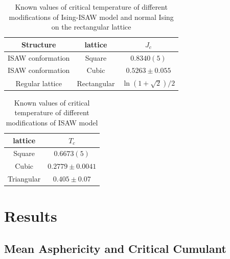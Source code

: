\documentclass[a4paper]{jpconf}
\begin{document}
\begin{table}[h]
    \centering
    \begin{tabular}{|c|c|c|}
        \hline
        Structure & lattice & $J_{c}$ \\ \hline
        ISAW conformation & Square & $0.8340(5)$\cite{faizullina2021critical} \\ \hline
        ISAW conformation & Cubic & $0.5263 \pm 0.055$\cite{Foster2021}\\ \hline
        Regular lattice & Rectangular & $\ln{(1 + \sqrt{2}) / 2}$\cite{Onsager}\\ \hline
    \end{tabular}
    \caption{Known values of critical temperature of different modifications of Ising-ISAW model and normal Ising on the rectangular lattice}
    \label{tab:Ising_T_c}
\end{table}

\begin{table}[h]
    \centering
    \begin{tabular}{|c|c|}
        \hline
        lattice & $T_{c}$ \\ \hline
        Square & $0.6673(5)$ \cite{Caracciolo2011} \\ \hline
        Cubic & $0.2779 \pm 0.0041$\cite{Tesi1996} \\ \hline
        Triangular & $ 0.405 \pm 0.07$\cite{Privman1986} \\ \hline
    \end{tabular}
    \caption{Known values of critical temperature of different modifications of ISAW model}
    \label{tab:ISAW_T_c}
\end{table}




\section{Results}


\subsection{Mean Asphericity and Critical Cumulant}
\end{document}
